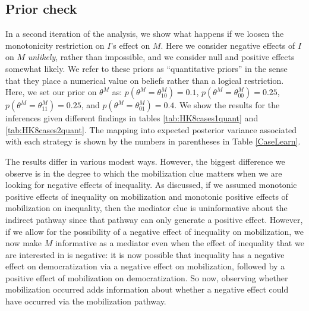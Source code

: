 \documentclass[12pt,]{book}
\begin{document}
\hypertarget{prior-check}{%
\subsection{Prior check}\label{prior-check}}

In a second iteration of the analysis, we show what happens if we loosen the monotonicity restriction on \(I\)'s effect on \(M\). Here we consider negative effects of \(I\) on \(M\) \emph{unlikely}, rather than impossible, and we consider null and positive effects somewhat likely. We refer to these priors as ``quantitative priors'' in the sense that they place a numerical value on beliefs rather than a logical restriction. Here, we set our prior on \(\theta^M\) as: \(p(\theta^M=\theta^M_{10})=0.1\), \(p(\theta^M=\theta^M_{00})=0.25\), \(p(\theta^M=\theta^M_{11})=0.25\), and \(p(\theta^M=\theta^M_{01})=0.4\). We show the results for the inferences given different findings in tables \ref{tab:HK8cases1quant} and \ref{tab:HK8cases2quant}. The mapping into expected posterior variance associated with each strategy is shown by the numbers in parentheses in Table \ref{CaseLearn}.

The results differ in various modest ways. However, the biggest difference we observe is in the degree to which the mobilization clue matters when we are looking for negative effects of inequality. As discussed, if we assumed monotonic positive effects of inequality on mobilization and monotonic positive effects of mobilization on inequality, then the mediator clue is uninformative about the indirect pathway since that pathway can only generate a positive effect. However, if we allow for the possibility of a negative effect of inequality on mobilization, we now make \(M\) informative as a mediator even when the effect of inequality that we are interested in is negative: it is now possible that inequality has a negative effect on democratization via a negative effect on mobilization, followed by a positive effect of mobilization on democratization. So now, observing whether mobilization occurred adds information about whether a negative effect could have occurred via the mobilization pathway.
\end{document}
